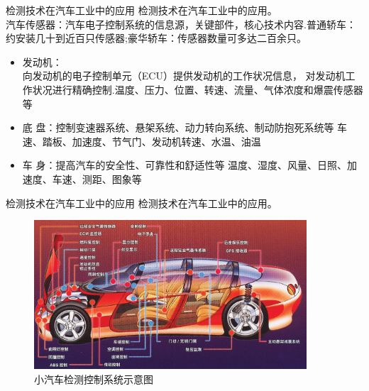 \documentclass[10pt]{beamer}
\begin{document}
\begin{frame}{检测技术在汽车工业中的应用}
检测技术在汽车工业中的应用。\\
\alert{汽车传感器：}汽车电子控制系统的信息源，关键部件，核心技术内容.普通轿车：约安装几十到近百只传感器;豪华轿车：传感器数量可多达二百余只。 
    \begin{itemize}
        \item 发动机：\\向发动机的电子控制单元（ECU）提供发动机的工作状况信息， 对发动机工作状况进行精确控制.温度、压力、位置、转速、流量、气体浓度和爆震传感器等\\
        \item 底    盘：控制变速器系统、悬架系统、动力转向系统、制动防抱死系统等  车速、踏板、加速度、节气门、发动机转速、水温、油温 
        \item 车    身：提高汽车的安全性、可靠性和舒适性等 
         温度、湿度、风量、日照、加速度、车速、测距、图象等 
    \end{itemize}
\end{frame}
\begin{frame}{检测技术在汽车工业中的应用}
检测技术在汽车工业中的应用。\\
            \begin{figure}[htbp] 
            \centering\includegraphics[width=4in]{source/intro3.jpg} \caption{小汽车检测控制系统示意图}\label{fig:3a} 
            \end{figure}
\end{frame}
\end{document}
